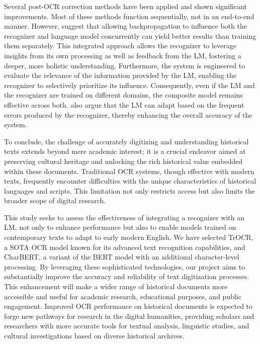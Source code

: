 Several post-OCR correction methods have been applied and shown significant improvements. Most of these methods function sequentially, not in an end-to-end manner. However, \cite{kang2021candidate} suggest that allowing backpropagation to influence both the recognizer and language model concurrently can yield better results than training them separately. This integrated approach allows the recognizer to leverage insights from its own processing as well as feedback from the LM, fostering a deeper, more holistic understanding. Furthermore, the system is engineered to evaluate the relevance of the information provided by the LM, enabling the recognizer to selectively prioritize its influence. Consequently, even if the LM and the recognizer are trained on different domains, the composite model remains effective across both. \cite{kang2021candidate} also argue that the LM can adapt based on the frequent errors produced by the recognizer, thereby enhancing the overall accuracy of the system.

To conclude, the challenge of accurately digitizing and understanding historical texts extends beyond mere academic interest; it is a crucial endeavor aimed at preserving cultural heritage and unlocking the rich historical value embedded within these documents. Traditional OCR systems, though effective with modern texts, frequently encounter difficulties with the unique characteristics of historical languages and scripts. This limitation not only restricts access but also limits the broader scope of digital research.

This study seeks to assess the effectiveness of integrating a recognizer with an LM, not only to enhance performance but also to enable models trained on contemporary texts to adapt to early modern English. We have selected TrOCR, a SOTA OCR model known for its advanced text recognition capabilities, and CharBERT, a variant of the BERT model with an additional character-level processing. By leveraging these sophisticated technologies, our project aims to substantially improve the accuracy and reliability of text digitization processes. This enhancement will make a wider range of historical documents more accessible and useful for academic research, educational purposes, and public engagement. Improved OCR performance on historical documents is expected to forge new pathways for research in the digital humanities, providing scholars and researchers with more accurate tools for textual analysis, linguistic studies, and cultural investigations based on diverse historical archives.

